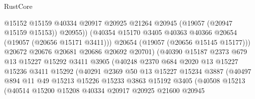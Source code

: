 \begin{lexlean}{RustCore}
\begin{coremodule}
                                @15152
                                @15159
                                @40334
                                @20917
                                @20925
                                @21264
                                @20945
                                (@19057 (@20947 @15159 @15153))
                                @20955))
                            (@40354
                              @15170
                              @3405
                              @40363
                              @40366
                              @20654
                              (@19057 (@20656 @15171 @3411)))
                            @20654
                            (@19057 (@20656 @15145 @15177)))
                          @20672
                          @20676
                          @20681
                          @20686
                          @20692
                          @20701)
                        (@40390
                          @15187
                          @2373
                          @679
                          @13
                          @15227
                          @15292
                          @3411
                          @3905
                          (@40248
                            @2370
                            @684
                            @2020
                            @13
                            @15227
                            @15236
                            @3411
                            @15292
                            (@40291
                              @2369
                              @50
                              @13
                              @15227
                              @15234
                              @3887
                              (@40497
                                @894
                                @11
                                @49
                                @15213
                                @15226
                                @15233
                                @3863
                                @15192
                                @3405
                                (@40508
                                  @15213
                                  (@40514
                                    @15200
                                    @15208
                                    @40334
                                    @20917
                                    @20925
                                    @21600
                                    @20945

\end{coremodule}
\end{lexlean}
